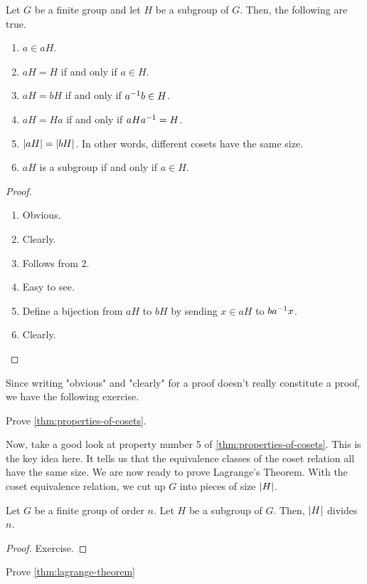 \documentclass[./main.tex]{subfiles}
\begin{document}
\begin{theorem}
\label{thm:properties-of-cosets}
    Let $G$ be a finite group and let $H$ be a subgroup of $G$. Then, the following are true.

    \begin{enumerate}
        \item $a \in aH$.
        \item $aH = H$ if and only if $a \in H$.
        \item $aH = bH$ if and only if $a^{-1} b \in H$.
        \item $aH = Ha$ if and only if $aHa^{-1} = H$.
        \item $\abs{aH} = \abs{bH}$. In other words, different cosets have the same size.
        \item $aH$ is a subgroup if and only if $a \in H$.
    \end{enumerate}
\end{theorem}
\begin{proof}
    \begin{enumerate}
        \item Obvious.
        \item Clearly. 
        \item Follows from 2.
        \item Easy to see.
        \item Define a bijection from $aH$ to $bH$ by sending $x \in aH$ to $ba^{-1} x$.
        \item Clearly.
    \end{enumerate}
\end{proof}
Since writing "obvious" and "clearly" for a proof doesn't really constitute a proof,
we have the following exercise.
\begin{exercise}
    Prove \cref{thm:properties-of-cosets}.
\end{exercise}

Now, take a good look at property number 5 of \cref{thm:properties-of-cosets}.
This is the key idea here. It tells us that the equivalence classes of the coset
relation all have the same size. We are now ready to prove Lagrange's Theorem. With
the coset equivalence relation, we cut up $G$ into pieces of size $\abs{H}$. 
\begin{theorem}
\label{thm:lagrange-theorem}
    Let $G$ be a finite group of order $n$. Let $H$ be a subgroup of $G$. Then,
    $\abs{H}$ divides $n$.
\end{theorem}
\begin{proof}
    Exercise.
\end{proof}
\begin{exercise}
    Prove \cref{thm:lagrange-theorem}
\end{exercise}
\end{document}
